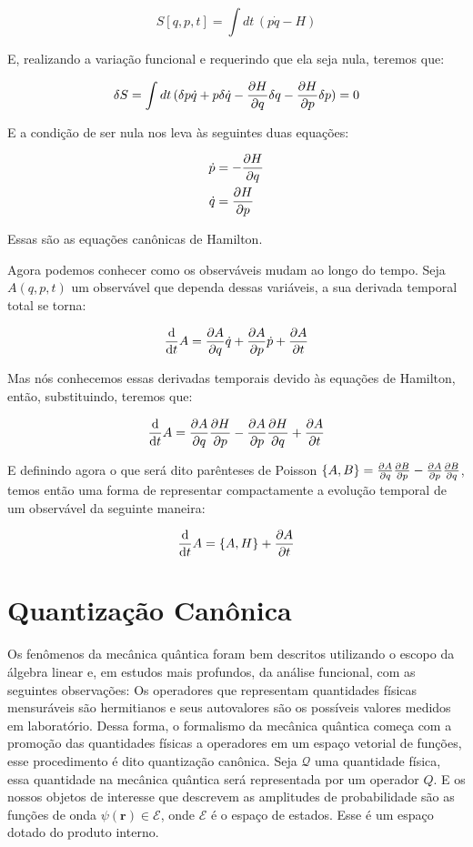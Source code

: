\documentclass{article}
\begin{document}
	$$S[q,p,t]= \int dt \, (p\dot{q}-H)$$
	
	E, realizando a variação funcional e requerindo que ela seja nula, teremos que:
	
	$$ \delta S = \int dt \, (\delta p \dot{q} + p \delta \dot{q} - \pdv{H}{q}\delta q - \pdv{H}{p}\delta p) = 0$$
	
	E a condição de ser nula nos leva às seguintes duas equações:
	
	\begin{align*}
		\dot{p}&=-\pdv{H}{q}\\
		\dot{q}&=\pdv{H}{p}
	\end{align*}
	
	Essas são as equações canônicas de Hamilton.
	
	Agora podemos conhecer como os observáveis mudam ao longo do tempo. Seja $A(q,p,t)$ um observável que dependa dessas variáveis, a sua derivada temporal total se torna:
	
	$$\dv{t} A=\pdv{A}{q}\dot{q}+\pdv{A}{p}\dot{p}+\pdv{A}{t}$$
	
	Mas nós conhecemos essas derivadas temporais devido às equações de Hamilton, então, substituindo, teremos que:
	
	$$\dv{t} A=\pdv{A}{q}\pdv{H}{p}-\pdv{A}{p}\pdv{H}{q}+\pdv{A}{t}$$
	
	E definindo agora o que será dito parênteses de Poisson $\qty{A, B} = \pdv{A}{q}\pdv{B}{p}-\pdv{A}{p}\pdv{B}{q}$, temos então uma forma de representar compactamente a evolução temporal de um observável da seguinte maneira:
	
	$$\dv{t} A=\qty{ A, H}+\pdv{A}{t}$$
	
	\newpage
	\section{Quantização Canônica}
	
	Os fenômenos da mecânica quântica foram bem descritos utilizando o escopo da álgebra linear e, em estudos mais profundos, da análise funcional, com as seguintes observações: Os operadores que representam quantidades físicas mensuráveis são hermitianos e seus autovalores são os possíveis valores medidos em laboratório. Dessa forma, o formalismo da mecânica quântica começa com a promoção das quantidades físicas a operadores em um espaço vetorial de funções, esse procedimento é dito quantização canônica. Seja $\mathcal{Q}$ uma quantidade física, essa quantidade na mecânica quântica será representada por um operador $Q$. E os nossos objetos de interesse que descrevem as amplitudes de probabilidade são as funções de onda $\psi(\mathbf{r}) \in \mathcal{E}$, onde $\mathcal{E}$ é o espaço de estados. Esse é um espaço dotado do produto interno.
	
\end{document}
